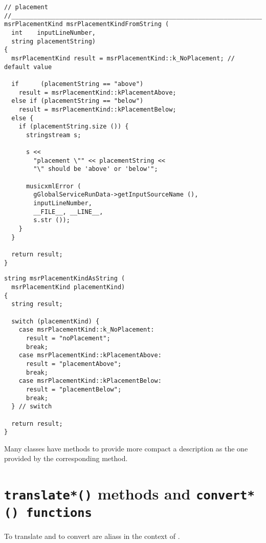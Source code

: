 \begin{lstlisting}[language=CPlusPlus]
// placement
//______________________________________________________________________________
msrPlacementKind msrPlacementKindFromString (
  int    inputLineNumber,
  string placementString)
{
  msrPlacementKind result = msrPlacementKind::k_NoPlacement; // default value

  if      (placementString == "above")
    result = msrPlacementKind::kPlacementAbove;
  else if (placementString == "below")
    result = msrPlacementKind::kPlacementBelow;
  else {
    if (placementString.size ()) {
      stringstream s;

      s <<
        "placement \"" << placementString <<
        "\" should be 'above' or 'below'";

      musicxmlError (
        gGlobalServiceRunData->getInputSourceName (),
        inputLineNumber,
        __FILE__, __LINE__,
        s.str ());
    }
  }

  return result;
}
\end{lstlisting}

\begin{lstlisting}[language=CPlusPlus]
string msrPlacementKindAsString (
  msrPlacementKind placementKind)
{
  string result;

  switch (placementKind) {
    case msrPlacementKind::k_NoPlacement:
      result = "noPlacement";
      break;
    case msrPlacementKind::kPlacementAbove:
      result = "placementAbove";
      break;
    case msrPlacementKind::kPlacementBelow:
      result = "placementBelow";
      break;
  } // switch

  return result;
}
\end{lstlisting}

Many classes have  methods to provide more compact a description as the one provided by the corresponding  method.%


\section{{\tt translate*()} methods and {\tt convert*() functions}}

To translate and to convert are aliass in the context of \mf.


